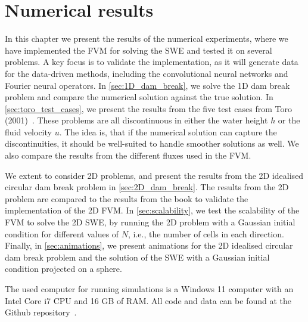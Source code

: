 \chapter{Numerical results}\label{ch:numerical_results}
In this chapter we present the results of the numerical experiments, where we have implemented the FVM for solving the SWE and tested it on several problems.
A key focus is to validate the implementation, as it will generate data for the data-driven methods, including the convolutional neural networks and Fourier neural operators.
In \autoref{sec:1D_dam_break}, we solve the 1D dam break problem and compare the numerical solution against the true solution.
In \autoref{sec:toro_test_cases}, we present the results from the five test cases from Toro (2001)~\cite{Toro2001-Shock}.
These problems are all discontinuous in either the water height $h$ or the fluid velocity $u$.
The idea is, that if the numerical solution can capture the discontinuities, it should be well-suited to handle smoother solutions as well.
We also compare the results from the different fluxes used in the FVM.

We extent to consider 2D problems, and present the results from the 2D idealised circular dam break problem in \autoref{sec:2D_dam_break}.
The results from the 2D problem are compared to the results from the book to validate the implementation of the 2D FVM.
In \autoref{sec:scalability}, we test the scalability of the FVM to solve the 2D SWE, by running the 2D problem with a Gaussian initial condition for different values of $N$, i.e., the number of cells in each direction.
Finally, in \autoref{sec:animations}, we present animations for the 2D idealised circular dam break problem and the solution of the SWE with a Gaussian initial condition projected on a sphere.

The used computer for running simulations is a Windows 11 computer with an Intel Core i7 CPU and 16 GB of RAM.
All code and data can be found at the Github repository~\cite{Github_SWE}.

